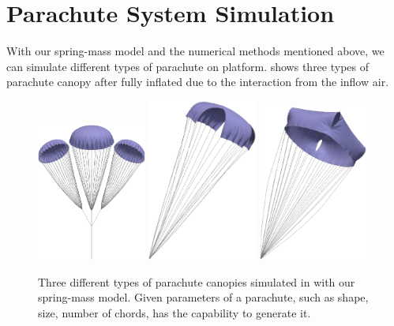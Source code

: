 \section{Parachute System Simulation}
With our spring-mass model and the numerical methods mentioned above, we can
simulate different types of parachute on \FronTierp platform.
 shows three types of parachute canopy after fully
inflated due to the interaction from the inflow air.
\begin{figure}[!ht]
\centering
\includegraphics[width=0.32\textwidth]{figures/3G11_canopy}
\includegraphics[width=0.32\textwidth]{figures/Cross_canopy}
\includegraphics[width=0.32\textwidth]{figures/T11_canopy}
\caption{Three different types of parachute canopies simulated in \FronTierp
with our spring-mass model. Given parameters of a parachute, such as shape,
size, number of chords, \FronTierp has the capability to generate it.}
\label{fig:canopies}
\end{figure}

